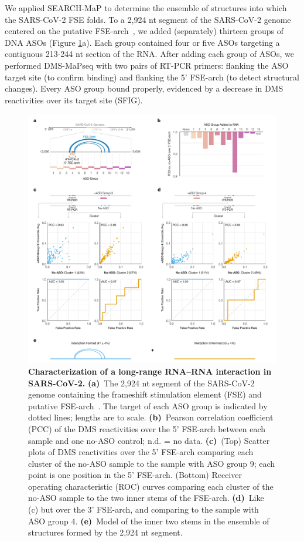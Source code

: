 \documentclass[main.tex]{subfiles}
\begin{document}
We applied SEARCH-MaP to determine the ensemble of structures into which the SARS-CoV-2 FSE folds.
To a 2,924 nt segment of the SARS-CoV-2 genome centered on the putative FSE-arch~\cite{Ziv2020}, we added (separately) thirteen groups of DNA ASOs (Figure \ref{tiles}a).
Each group contained four or five ASOs targeting a contiguous 213-244 nt section of the RNA.
After adding each group of ASOs, we performed DMS-MaPseq with two pairs of RT-PCR primers: flanking the ASO target site (to confirm binding) and flanking the 5' FSE-arch (to detect structural changes).
Every ASO group bound properly, evidenced by a decrease in DMS reactivities over its target site (SFIG).

\begin{figure}[H]
	\includegraphics[width=\textwidth]{../MainFigures/sars2-tile/sars2-tile.pdf}
	\caption{\textbf{Characterization of a long-range RNA--RNA interaction in SARS-CoV-2.} \textbf{(a)}~The 2,924 nt segment of the SARS-CoV-2 genome containing the frameshift stimulation element (FSE) and putative FSE-arch~\cite{Ziv2020}. The target of each ASO group is indicated by dotted lines; lengths are to scale. \textbf{(b)}~Pearson correlation coefficient (PCC) of the DMS reactivities over the 5' FSE-arch between each sample and one no-ASO control; n.d. = no data. \textbf{(c)}~(Top) Scatter plots of DMS reactivities over the 5' FSE-arch comparing each cluster of the no-ASO sample to the sample with ASO group 9; each point is one position in the 5' FSE-arch. (Bottom) Receiver operating characteristic (ROC) curves comparing each cluster of the no-ASO sample to the two inner stems of the FSE-arch. \textbf{(d)}~Like (c) but over the 3' FSE-arch, and comparing to the sample with ASO group 4. \textbf{(e)}~Model of the inner two stems in the ensemble of structures formed by the 2,924 nt segment.}
	\label{tiles}
\end{figure}
\end{document}

